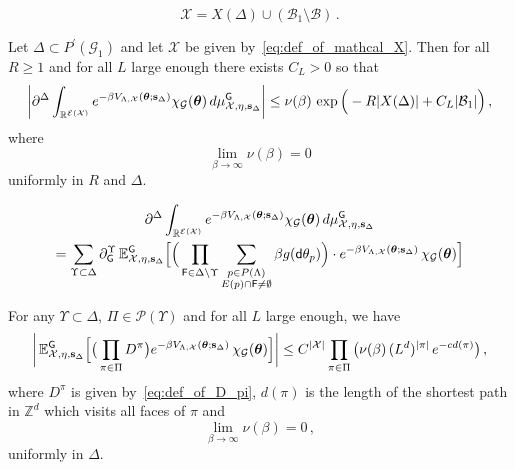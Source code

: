 \documentclass[10pt,a4paper]{amsart}
\def\La{{\Lambda}}
\newcommand{\bE}{\mathbb E}
\newcommand{\bR}{\mathbb R}
\newcommand{\bZ}{\mathbb Z}
\newcommand{\cE}{\mathcal{E}}
\begin{document}
    \begin{equation}
    \label{eq:def_of_mathcal_X}
        \mathcal{X} = X(\Delta)\cup (\mathcal{B}_1 \setminus \mathcal{B}) \, . 
    \end{equation}

    \begin{claim}\label{claim:estimate_of_derivative_non_gaussian_correction_X}
        Let $\Delta\subset P^\prime(\mathcal{G}_1)$ and let $\mathcal{X}$ be given by~\eqref{eq:def_of_mathcal_X}. Then for all $R \ge 1$ and for all $L$ large enough there exists $C_L>0$ so that  
        \[
        \bigg| \partial^\Delta \int_{\bR^{\cE(\mathcal{X})}} e^{-\beta V_{\Lambda,\mathcal{X}}(\boldsymbol{\theta};\mathbf{s}_\Delta)} \chi_{\mathcal{G}}(\boldsymbol{\theta}) \, {\rm d}\mu_{\mathcal{X},\eta,\mathbf{s}_\Delta}^{\sf G} \bigg| \le \nu(\beta) \, \exp\Big(-R|X(\Delta)| + C_L |\mathcal{B}_1|\Big)  \, , 
        \]
        where
        \[
        \lim_{\beta \to \infty} \nu(\beta) = 0
        \]
        uniformly in $R$ and $\Delta$. 
    \end{claim}

    \begin{multline} \label{eq:derivative_of_Xi_wrt_Delta_after_leibnitz}
    \partial^\Delta \int_{\bR^{\cE(\mathcal{X})}} e^{-\beta V_{\Lambda,\mathcal{X}}(\boldsymbol{\theta};\mathbf{s}_\Delta)} \chi_{\mathcal{G}}(\boldsymbol{\theta}) \, {\rm d}\mu_{\mathcal{X},\eta,\mathbf{s}_\Delta}^{\sf G} \\  = \sum_{\Upsilon\subset \Delta} \partial_{{\sf G}}^{\Upsilon}  \, \bE_{\mathcal{X},\eta,\mathbf{s}_{\Delta}}^{\sf G}\Big[ \Big( \prod_{{\sf F} \in \Delta\setminus \Upsilon} \sum_{\substack{p\in P(\La) \\ E(p)\cap {\sf F} \not= \emptyset }}\beta g({\sf d} \theta_p)\Big) \cdot e^{-\beta V_{\La,\mathcal{X}} (\boldsymbol{\theta}; \mathbf{s}_{\Delta})} \, \chi_{\mathcal{G}} (\boldsymbol{\theta}) \Big]
    \end{multline}

    \begin{claim} \label{claim:bound_of_derivative_of_non_gaussian_correction_with_repsect_to_gaussian_measure}
        For any $\Upsilon\subset \Delta$, $\Pi\in \mathcal{P}(\Upsilon)$ and for all $L$ large enough, we have
        \[
        \bigg| \,  \bE_{\mathcal{X},\eta,\mathbf{s}_{\Delta}}^{\sf G} \Big[ \big( \prod_{\pi\in \Pi} D^\pi\big) e^{-\beta V_{\La,\mathcal{X}} (\boldsymbol{\theta}; \mathbf{s}_{\Delta})} \, \chi_{\mathcal{G}} (\boldsymbol{\theta})  \Big] \bigg| \le C^{|\mathcal{X}|} \prod_{\pi\in \Pi} \big(\nu(\beta) \, (L^{d})^{|\pi|} \, e^{-c d(\pi)}\big)\, , 
        \]
        where $D^\pi$ is given by~\eqref{eq:def_of_D_pi}, $d(\pi)$ is the length of the shortest path in $\bZ^d$ which visits all faces of $\pi$ and 
        \[
        \lim_{\beta\to \infty} \nu(\beta) = 0 \, ,
        \]
        uniformly in $\Delta$. 
    \end{claim}
\end{document}
